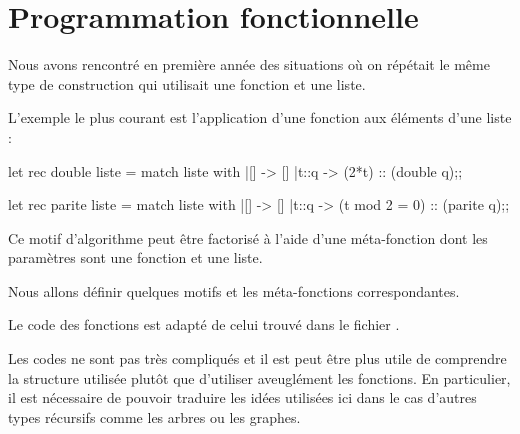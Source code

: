 \chapter{Programmation fonctionnelle}
Nous avons rencontré en première année des situations où on répétait le même type de construction qui utilisait une fonction et une liste. 

L'exemple le plus courant est l'application d'une fonction aux éléments d'une liste :

\begin{ocaml}
let rec double liste =
   match liste with
   |[] -> []
   |t::q -> (2*t) :: (double q);; 
\end{ocaml} 

\begin{ocaml}
let rec parite liste =
   match liste with
   |[] -> []
   |t::q -> (t mod 2 = 0) :: (parite q);; 
\end{ocaml} 

Ce motif d'algorithme peut être factorisé à l'aide d'une méta-fonction dont les paramètres sont une fonction et une liste.

Nous allons définir quelques motifs et les méta-fonctions correspondantes.

Le code des fonctions est adapté de celui trouvé dans le fichier .

Les codes ne sont pas très compliqués et il est peut être plus utile de comprendre la structure utilisée plutôt que d'utiliser aveuglément les fonctions.
En particulier, il est nécessaire de pouvoir traduire les idées utilisées ici dans le cas d'autres types récursifs comme les arbres ou les graphes.
